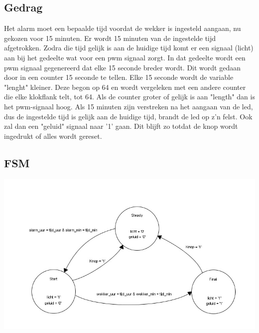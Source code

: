 \subsection{Gedrag}
Het alarm moet een bepaalde tijd voordat de wekker is ingesteld aangaan, nu gekozen voor 15 minuten.
Er wordt 15 minuten van de ingestelde tijd afgetrokken. Zodra die tijd gelijk is aan de huidige tijd komt er een signaal (licht) aan bij het gedeelte wat voor een pwm signaal zorgt.
In dat gedeelte wordt een pwm signaal gegenereerd dat elke 15 seconde breder wordt. Dit wordt gedaan door in een counter 15 seconde te tellen. Elke 15 seconde wordt de variable "lenght" kleiner. Deze begon op 64 en wordt vergeleken met een andere counter die elke klokflank telt, tot 64. Als de counter groter of gelijk is aan "length" dan is het pwm-signaal hoog. 
Als 15 minuten zijn verstreken na het aangaan van de led, dus de ingestelde tijd is gelijk aan de huidige tijd, brandt de led op z'n felst. Ook zal dan een "geluid" signaal naar '1' gaan. Dit blijft zo totdat de knop wordt ingedrukt of alles wordt gereset.

\subsection{FSM}
\includegraphics[width=\textwidth,height=\textheight,keepaspectratio]{FSM/alarm-compare-fsm.jpg}